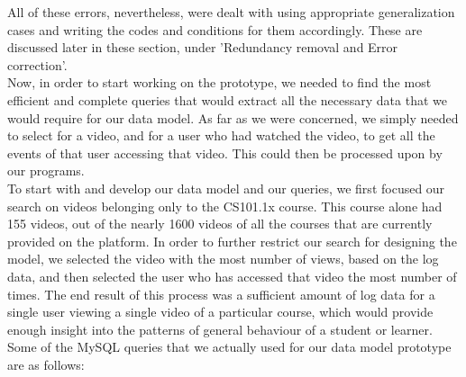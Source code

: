 \documentclass[16pt]{report}
\begin{document}
All of these errors, nevertheless, were dealt with using appropriate generalization cases and writing the codes and conditions for them accordingly. These are discussed later in these section, under 'Redundancy removal and Error correction'.\\


Now, in order to start working on the prototype, we needed to find the most efficient and complete queries that would extract all the necessary data that we would require for our data model. As far as we were concerned, we simply needed to select for a video, and for a user who had watched the video, to get all the events of that user accessing that video. This could then be processed upon by our programs.\\

To start with and develop our data model and our queries, we first focused our search on videos belonging only to the CS101.1x course. This course alone had 155 videos, out of the nearly 1600 videos of all the courses that are currently provided on the platform. In order to further restrict our search for designing the model, we selected the video with the most number of views, based on the log data, and then selected the user who has accessed that video the most number of times. The end result of this process was a sufficient amount of log data for a single user viewing a single video of a particular course, which would provide enough insight into the patterns of general behaviour of a student or learner. \\

Some of the MySQL queries that we actually used for our data model prototype are as follows:
\end{document}
